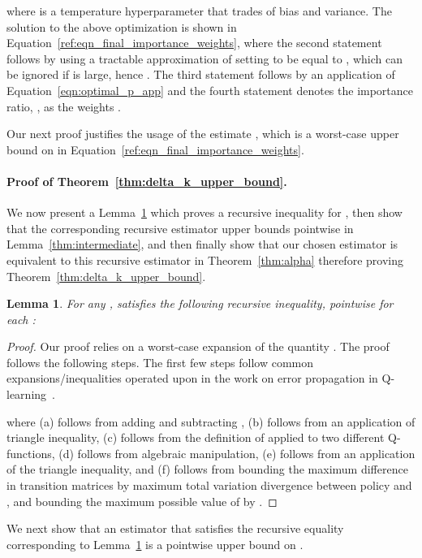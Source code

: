 \documentclass[jmlr]{article}
\newtheorem{lemma}{Lemma}[theorem]
\begin{document}
where  is a temperature hyperparameter that trades of bias and variance. The solution to the above optimization is shown in Equation~\ref{ref:eqn_final_importance_weights},
where the second statement follows by using a tractable approximation of setting  to be equal to , which can be ignored if  is large, hence . The third statement follows by an application of Equation~\ref{eqn:optimal_p_app} and the fourth statement denotes the importance ratio, , as the weights . 


Our next proof justifies the usage of the estimate , which is a worst-case upper bound on  in Equation~\ref{ref:eqn_final_importance_weights}.

\paragraph{Proof of Theorem~\ref{thm:delta_k_upper_bound}.} 
We now present a Lemma~\ref{thm:worst_case_estimator} which proves a recursive inequality for , then show that the corresponding recursive estimator upper bounds  pointwise in Lemma~\ref{thm:intermediate}, and then finally show that our chosen estimator  is equivalent to this recursive estimator in Theorem~\ref{thm:alpha} therefore proving Theorem~\ref{thm:delta_k_upper_bound}.
\begin{lemma}
\label{thm:worst_case_estimator}
For any ,  satisfies the following recursive inequality, pointwise for each :

\end{lemma}
\begin{proof}
Our proof relies on a worst-case expansion of the quantity . The proof follows the following steps. The first few steps follow common expansions/inequalities operated upon in the work on error propagation in Q-learning~\cite{munos2005error}.

where (a) follows from adding and subtracting , (b) follows from an application of triangle inequality, (c) follows from the definition of  applied to two different Q-functions, (d) follows from algebraic manipulation, (e) follows from an application of the triangle inequality, and (f) follows from bounding the maximum difference in transition matrices  by maximum total variation divergence between policy  and , and bounding the maximum possible value of  by .
\end{proof}

We next show that an estimator that satisfies the recursive equality corresponding to Lemma~\ref{thm:worst_case_estimator} is a pointwise upper bound on .
\end{document}
